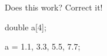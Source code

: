 Does this work? Correct it!



\begin{consolethree}[escapeinside=||]

double a[4];

a = {1.1, 3.3, 5.5, 7.7}; 

\end{consolethree}

